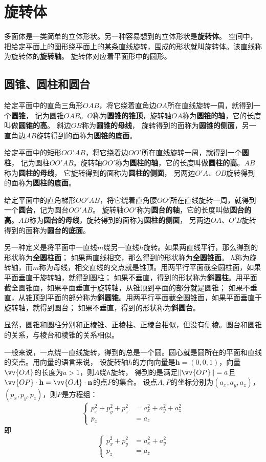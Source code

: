 \documentclass[12pt,UTF8]{ctexbook}
\begin{document}
\chapter{旋转体}

多面体是一类简单的立体形状。另一种容易想到的立体形状是\textbf{旋转体}。
空间中，把给定平面上的图形绕平面上的某条直线旋转，围成的形状就叫旋转体。该直线称为旋转体的\textbf{旋转轴}。
旋转体对应着平面形中的圆形。

\section{圆锥、圆柱和圆台}

给定平面中的直角三角形$OAB$，将它绕着直角边$OA$所在直线旋转一周，就得到一个\textbf{圆锥}，
记为圆锥$OAB$。$O$称为\textbf{圆锥的锥顶}，旋转轴$OA$称为\textbf{圆锥的轴}，它的长度叫做\textbf{圆锥的高}。
斜边$OB$称为\textbf{圆锥的母线}，
旋转得到的面称为\textbf{圆锥的侧面}，另一直角边$AB$旋转得到的面称为\textbf{圆锥的底面}。

给定平面中的矩形$OO'AB$，将它绕着边$OO'$所在直线旋转一周，就得到一个\textbf{圆柱}，
记为圆柱$OO'AB$。旋转轴$OO'$称为\textbf{圆柱的轴}，它的长度叫做\textbf{圆柱的高}。$AB$称为\textbf{圆柱的母线}，
它旋转得到的面称为\textbf{圆柱的侧面}，
另两边$O'A$、$OB$旋转得到的面称为\textbf{圆柱的底面}。

给定平面中的直角梯形$OO'AB$，将它绕着直角腰$OO'$所在直线旋转一周，就得到一个\textbf{圆台}，记为圆台$OO'AB$。
旋转轴$OO'$称为\textbf{圆台的轴}，它的长度叫做\textbf{圆台的高}。$AB$称为\textbf{圆台的母线}，旋转得到的面称为\textbf{圆柱的侧面}，
另两边$OA$、$O'B$旋转得到的面称为\textbf{圆台的底面}。

另一种定义是将平面中一直线$m$绕另一直线$h$旋转。如果两直线平行，那么得到的形状称为\textbf{全圆柱面}；
如果两直线相交，那么得到的形状称为\textbf{全圆锥面}。
$h$称为旋转轴，而$m$称为母线，相交直线的交点就是锥顶。用两平行平面截全圆柱面，如果平面垂直于旋转轴，就得到圆柱；
如果不垂直，得到的形状称为\textbf{斜圆柱}。用平面截全圆锥面，如果平面垂直于旋转轴，从锥顶到平面的部分就是圆锥；
如果不垂直，从锥顶到平面的部分称为\textbf{斜圆锥}。用两平行平面截全圆锥面，如果平面垂直于旋转轴，就得到圆台；
如果不垂直，得到的形状称为\textbf{斜圆台}。

显然，圆锥和圆柱分别和正棱锥、正棱柱、正棱台相似，但没有侧棱。圆台和圆锥的关系，与棱台和棱锥的关系相似。

一般来说，一点绕一直线旋转，得到的总是一个圆。圆心就是圆所在的平面和直线的交点。用向量的语言来说，
设旋转轴$h$的方向向量是$\mathbf{h} = (0,0,1)$，向量$\vv{OA}$的长度为$a>1$，则$A$绕$h$旋转，
得到的是满足$\|\vv{OP}\| = a$且$\vv{OP}\cdot\mathbf{h}=\vv{OA}\cdot\mathbf{n}$的点$P$的集合。
设点$A,P$的坐标分别为$(a_x,a_y,a_z)$，$(p_x,p_y,p_z)$，则$P$是方程组：
$$
\left\{
\begin{array}{rl}
    p_x^2+p_y^2+p_z^2 &= a_x^2+a_y^2+a_z^2 \\
    p_z &= a_z
\end{array}
\right.
$$
即
$$
\left\{
\begin{array}{rl}
    p_x^2+p_y^2 &= a_x^2+a_y^2 \\
    p_z &= a_z
\end{array}
\right.
$$
\end{document}
